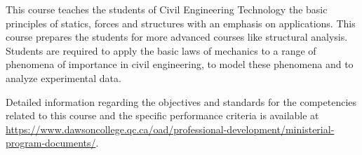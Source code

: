{This course teaches the students of Civil Engineering Technology the basic principles of statics, forces and structures with an emphasis on applications.  This course prepares the students for more advanced courses like structural analysis.  Students are required to apply the basic laws of mechanics to a range of phenomena of importance in civil engineering, to model these phenomena and to analyze experimental data.
\smallskip

Detailed information regarding the objectives and standards for the competencies related to this course and the specific performance criteria is available at \url{https://www.dawsoncollege.qc.ca/oad/professional-development/ministerial-program-documents/}.}

